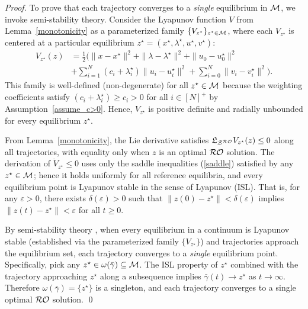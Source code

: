 \documentclass[journal,twoside,web]{ieeecolor}
\newcommand{\rev}[1]{\textcolor{revisionblue}{#1}}
\begin{document}
\begin{proof}
\rev{To prove that each trajectory converges to a \textit{single} equilibrium in ${\cal M}$, we invoke semi-stability theory. Consider the Lyapunov function $V$ from Lemma~\ref{monotonicity} as a parameterized family $\{V_{z^\star}\}_{z^\star \in {\cal M}}$, where each $V_{z^\star}$ is centered at a particular equilibrium $z^\star = (x^\star, \lambda^\star, u^\star, v^\star)$:
\begin{align*}
V_{z^\star}(z) &= \frac{1}{2}\big( \|x-x^\star\|^2 + \|\lambda-\lambda^\star\|^2 + \|u_0-u_0^\star\|^2 \nonumber\\&+ \sum_{i=1}^N(c_i+\lambda_i^\star) \|u_i-u_i^\star\|^2+ \sum_{i=0}^N\|v_i-v_i^\star\|^2 \big).
\end{align*}
This family is well-defined (non-degenerate) for all $z^\star \in {\cal M}$ because the weighting coefficients satisfy $(c_i + \lambda_i^\star) \geq c_i > 0$ for all $i \in [N]^+$ by Assumption~\ref{assume_c>0}. Hence, $V_{z^\star}$ is positive definite and radially unbounded for every equilibrium $z^\star$.}

\rev{From Lemma~\ref{monotonicity}, the Lie derivative satisfies $\mathfrak{L}_{{\cal Z}^{\cal RO}} V_{z^\star}(z) \leq 0$ along all trajectories, with equality only when $z$ is an optimal ${\cal RO}$ solution. The derivation of $\dot V_{z^\star} \leq 0$ uses only the saddle inequalities (\ref{saddle}) satisfied by any $z^\star \in {\cal M}$; hence it holds uniformly for all reference equilibria, and every equilibrium point is Lyapunov stable in the sense of Lyapunov (ISL). That is, for any $\varepsilon > 0$, there exists $\delta(\varepsilon) > 0$ such that $\|z(0) - z^\star\| < \delta(\varepsilon)$ implies $\|z(t) - z^\star\| < \varepsilon$ for all $t \geq 0$.}

\rev{By semi-stability theory \cite[Theorem~3.1]{haddad2009semistability}, when every equilibrium in a continuum is Lyapunov stable (established via the parameterized family $\{V_{z^\star}\}$) and trajectories approach the equilibrium set, each trajectory converges to a \textit{single} equilibrium point. Specifically, pick any $z^\star \in \omega(\bar{\gamma}) \subseteq {\cal M}$. The ISL property of $z^\star$ combined with the trajectory approaching $z^\star$ along a subsequence implies $\bar{\gamma}(t) \to z^\star$ as $t \to \infty$. Therefore $\omega(\bar{\gamma}) = \{z^\star\}$ is a singleton, and each trajectory converges to a single optimal ${\cal RO}$ solution.}
\qed
\end{proof}
\end{document}
